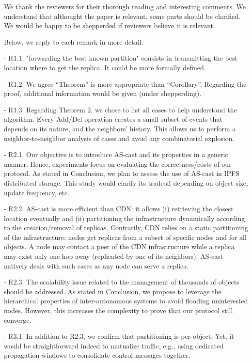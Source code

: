 We thank the reviewers for their thorough reading and interesting
comments.  We understand that althought the paper is relevant, some
parts should be clarified. We would be happy to be shepperded if
reviewers believe it is relevant.

Below, we reply to each remark in more detail.

- R1.1. "forwarding the best known partition" consists in transmitting
the best location where to get the replica.  It could be more formally
defined.

- R1.2.  We agree ``Theorem'' is more appropriate than
``Corollary''. Regarding the proof, additional information would be
given (under shepperding).

- R1.3. Regarding Theorem 2, we chose to list all cases to help
understand the algorithm.  Every Add/Del operation creates a small
subset of events that depends on its nature, and the neighbors'
history. This allows us to perform a neighbor-to-neighbor analysis of
cases and avoid any combinatorial explosion.

- R2.1. Our objective is to introduce AS-cast and its properties in a
generic manner.  Hence, experiments focus on evaluating the
correctness/costs of our protocol.  As stated in Conclusion, we plan
to assess the use of AS-cast in IPFS distributed storage. This study
would clarify its tradeoff depending on object size, update frequency,
etc.

- R2.2. AS-cast is more efficient than CDN: it allows (i) retrieving
the closest location eventually and (ii) partitioning the
infrastructure dynamically according to the creation/removal of
replicas. Contrarily, CDN relies on a static partitioning of the
infrastructure: nodes get replicas from a subset of specific nodes and
for all objects. A node may contact a peer of the CDN infrastructure
while a replica may exist only one hop away (replicated by one of its
neighbors).  AS-cast natively deals with such cases as any node can
serve a replica.

- R2.3.  The scalability issue related to the management of thousands
of objects should be addressed. As stated in Conclusion, we propose to
leverage the hierarchical properties of inter-autonomous systems to
avoid flooding uninterested nodes.  However, this increases the
complexity to prove that our protocol still converge.

- R3.1. In addition to R2.3, we confirm that partitioning is
per-object.  Yet, it would be straightforward indeed to mutualize
traffic, e.g., using dedicated propagation windows to consolidate
control messages together.

